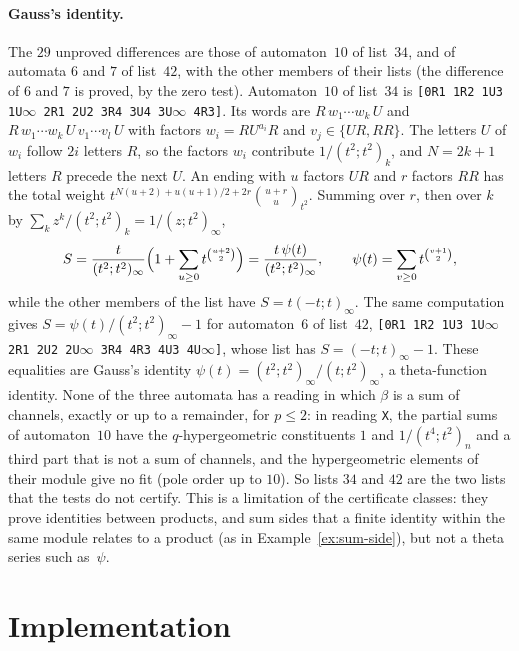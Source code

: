 \documentclass[11pt,a4paper]{article}
\theoremstyle{plain}
\theoremstyle{definition}
\theoremstyle{remark}
\begin{document}
\paragraph{Gauss's identity.} The $29$ unproved differences are those of
automaton~$10$ of list~$34$, and of automata $6$ and $7$ of list~$42$, with the
other members of their lists (the difference of $6$ and $7$ is proved, by the
zero test). Automaton~$10$ of list~$34$ is
\texttt{[0R1 1R2 1U3 1U$\infty$ 2R1 2U2 3R4 3U4 3U$\infty$ 4R3]}. Its words are
$R\,w_1\cdots w_k\,U$ and $R\,w_1\cdots w_k\,U\,v_1\cdots v_l\,U$ with factors
$w_i=RU^{a_i}R$ and $v_j\in\{UR,RR\}$. The letters $U$ of $w_i$ follow $2i$
letters $R$, so the factors $w_i$ contribute $1/(t^2;t^2)_k$, and $N=2k+1$
letters $R$ precede the next $U$. An ending with $u$ factors $UR$ and $r$ factors
$RR$ has the total weight $t^{N(u+2)+u(u+1)/2+2r}\binom{u+r}{u}_{t^2}$. Summing
over $r$, then over $k$ by $\sum_kz^k/(t^2;t^2)_k=1/(z;t^2)_\infty$,
\[
  S=\frac{t}{(t^2;t^2)_\infty}\Bigl(1+\sum_{u\ge0}t^{\binom{u+2}2}\Bigr)
   =\frac{t\,\psi(t)}{(t^2;t^2)_\infty},\qquad \psi(t)=\sum_{v\ge0}t^{\binom{v+1}2},
\]
while the other members of the list have $S=t(-t;t)_\infty$. The same
computation gives $S=\psi(t)/(t^2;t^2)_\infty-1$ for automaton~$6$ of list~$42$,
\texttt{[0R1 1R2 1U3 1U$\infty$ 2R1 2U2 2U$\infty$ 3R4 4R3 4U3 4U$\infty$]}, whose
list has $S=(-t;t)_\infty-1$. These equalities are Gauss's identity
$\psi(t)=(t^2;t^2)_\infty/(t;t^2)_\infty$, a theta-function identity. None of
the three automata has a reading in which $\beta$ is a sum of channels, exactly or
up to a remainder, for $p\le2$: in reading \texttt{X}, the partial sums of
automaton~$10$ have the $q$-hypergeometric constituents $1$ and $1/(t^4;t^2)_n$
and a third part that is not a sum of channels, and the hypergeometric elements
of their module give no fit (pole order up to $10$). So lists $34$ and $42$ are
the two lists that the tests do not certify. This is a limitation of the
certificate classes: they prove identities between products, and sum sides that
a finite identity within the same module relates to a product (as in
Example~\ref{ex:sum-side}), but not a theta series such as~$\psi$.

\section{Implementation}\label{sec:implementation}
\sloppy
\end{document}
